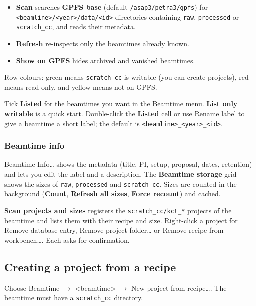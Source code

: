 \documentclass[11pt,a4paper]{article}
\newcommand{\cmd}[1]{\texttt{#1}}
\newcommand{\ui}[1]{\textsf{\textbf{#1}}}
\newcommand{\menu}[1]{\textsf{#1}}
\begin{document}
\begin{itemize}
  \item \ui{Scan} searches \ui{GPFS base} (default \cmd{/asap3/petra3/gpfs}) for
    \cmd{<beamline>/<year>/data/<id>} directories containing \cmd{raw}, \cmd{processed} or
    \cmd{scratch\_cc}, and reads their metadata.
  \item \ui{Refresh} re-inspects only the beamtimes already known.
  \item \ui{Show on GPFS} hides archived and vanished beamtimes.
\end{itemize}

Row colours: \textcolor{green!50!black}{green} means \cmd{scratch\_cc} is writable (you can create
projects), \textcolor{red!70!black}{red} means read-only, and \textcolor{orange!80!black}{yellow}
means not on GPFS.

Tick \ui{Listed} for the beamtimes you want in the \menu{Beamtime} menu. \ui{List only writable}
is a quick start. Double-click the \ui{Listed} cell or use \menu{Rename label} to give a beamtime a
short label; the default is \cmd{<beamline>\_<year>\_<id>}.

\subsubsection*{Beamtime info}

\menu{Beamtime Info\ldots} shows the metadata (title, PI, setup, proposal, dates, retention) and
lets you edit the label and a description. The \ui{Beamtime storage} grid shows the sizes of
\cmd{raw}, \cmd{processed} and \cmd{scratch\_cc}. Sizes are counted in the background (\ui{Count},
\ui{Refresh all sizes}, \ui{Force recount}) and cached.

\ui{Scan projects and sizes} registers the \cmd{scratch\_cc/kct\_*} projects of the beamtime and
lists them with their recipe and size. Right-click a project for \menu{Remove database entry},
\menu{Remove project folder\ldots} or \menu{Remove recipe from workbench\ldots}. Each asks for
confirmation.

\subsection{Creating a project from a recipe}\label{sec:newproject}

Choose \menu{Beamtime $\rightarrow$ <beamtime> $\rightarrow$ New project from recipe\ldots}. The
beamtime must have a \cmd{scratch\_cc} directory.
\end{document}
